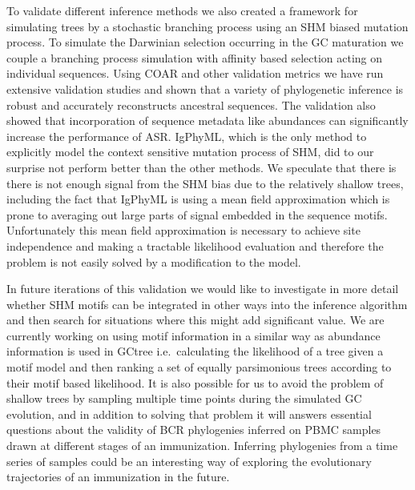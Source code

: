 To validate different inference methods we also created a framework for simulating trees by a stochastic branching process using an SHM biased mutation process.
To simulate the Darwinian selection occurring in the GC maturation we couple a branching process simulation with affinity based selection acting on individual sequences.
Using COAR and other validation metrics we have run extensive validation studies and shown that a variety of phylogenetic inference is robust and accurately reconstructs ancestral sequences.
The validation also showed that incorporation of sequence metadata like abundances can significantly increase the performance of ASR.
IgPhyML, which is the only method to explicitly model the context sensitive mutation process of SHM, did to our surprise not perform better than the other methods.
We speculate that there is there is not enough signal from the SHM bias due to the relatively shallow trees, including the fact that IgPhyML is using a mean field approximation which is prone to averaging out large parts of signal embedded in the sequence motifs.
Unfortunately this mean field approximation is necessary to achieve site independence and making a tractable likelihood evaluation and therefore the problem is not easily solved by a modification to the model.

In future iterations of this validation we would like to investigate in more detail whether SHM motifs can be integrated in other ways into the inference algorithm and then search for situations where this might add significant value.
We are currently working on using motif information in a similar way as abundance information is used in GCtree i.e.\ calculating the likelihood of a tree given a motif model and then ranking a set of equally parsimonious trees according to their motif based likelihood.
It is also possible for us to avoid the problem of shallow trees by sampling multiple time points during the simulated GC evolution, and in addition to solving that problem it will answers essential questions about the validity of BCR phylogenies inferred on PBMC samples drawn at different stages of an immunization.
Inferring phylogenies from a time series of samples could be an interesting way of exploring the evolutionary trajectories of an immunization in the future.

